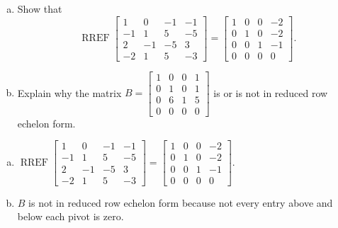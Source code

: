 
\begin{exerciseStatement}

\begin{enumerate}[(a)]
\item Show that \[\operatorname{RREF} \left[\begin{array}{cccc}
1 & 0 & -1 & -1 \\
-1 & 1 & 5 & -5 \\
2 & -1 & -5 & 3 \\
-2 & 1 & 5 & -3
\end{array}\right] = \left[\begin{array}{cccc}
1 & 0 & 0 & -2 \\
0 & 1 & 0 & -2 \\
0 & 0 & 1 & -1 \\
0 & 0 & 0 & 0
\end{array}\right] .\]
\item Explain why the matrix \(B= \left[\begin{array}{cccc}
1 & 0 & 0 & 1 \\
0 & 1 & 0 & 1 \\
0 & 6 & 1 & 5 \\
0 & 0 & 0 & 0
\end{array}\right] \) is or is not in reduced row echelon form.
\end{enumerate}
    
\end{exerciseStatement}
    
\begin{exerciseAnswer} 

\begin{enumerate}[(a)]
\item \(\operatorname{RREF} \left[\begin{array}{cccc}
1 & 0 & -1 & -1 \\
-1 & 1 & 5 & -5 \\
2 & -1 & -5 & 3 \\
-2 & 1 & 5 & -3
\end{array}\right] = \left[\begin{array}{cccc}
1 & 0 & 0 & -2 \\
0 & 1 & 0 & -2 \\
0 & 0 & 1 & -1 \\
0 & 0 & 0 & 0
\end{array}\right] .\)
\item \(B\) is not in reduced row echelon form because not every entry above and below each pivot is zero. 
\end{enumerate}
    
\end{exerciseAnswer}
    
